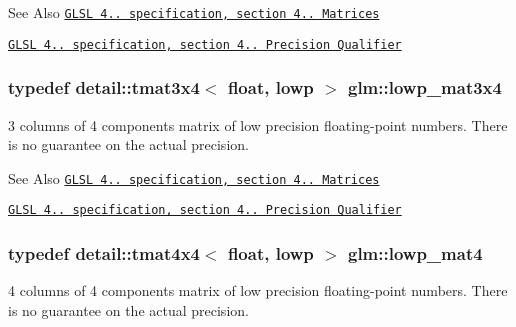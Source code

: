 \begin{DoxySeeAlso}{See Also}
\href{http://www.opengl.org/registry/doc/GLSLangSpec.4.20.8.pdf}{\tt G\-L\-S\-L 4.. specification, section 4.. Matrices} 

\href{http://www.opengl.org/registry/doc/GLSLangSpec.4.20.8.pdf}{\tt G\-L\-S\-L 4.. specification, section 4.. Precision Qualifier} 
\end{DoxySeeAlso}
\hypertarget{group__core__precision_ga9cea06e7378fe59abf95c1f56edc4320}{
\subsubsection[{lowp\-\_\-mat3x4}]{\setlength{\rightskip}{0pt plus 5cm}typedef detail\-::tmat3x4$<$ float, lowp $>$ {\bf glm\-::lowp\-\_\-mat3x4}}}\label{group__core__precision_ga9cea06e7378fe59abf95c1f56edc4320}
3 columns of 4 components matrix of low precision floating-\/point numbers. There is no guarantee on the actual precision.

\begin{DoxySeeAlso}{See Also}
\href{http://www.opengl.org/registry/doc/GLSLangSpec.4.20.8.pdf}{\tt G\-L\-S\-L 4.. specification, section 4.. Matrices} 

\href{http://www.opengl.org/registry/doc/GLSLangSpec.4.20.8.pdf}{\tt G\-L\-S\-L 4.. specification, section 4.. Precision Qualifier} 
\end{DoxySeeAlso}
\hypertarget{group__core__precision_ga8f6fef75ce51e9d6db7971478ad1f1c2}{
\subsubsection[{lowp\-\_\-mat4}]{\setlength{\rightskip}{0pt plus 5cm}typedef detail\-::tmat4x4$<$ float, lowp $>$ {\bf glm\-::lowp\-\_\-mat4}}}\label{group__core__precision_ga8f6fef75ce51e9d6db7971478ad1f1c2}
4 columns of 4 components matrix of low precision floating-\/point numbers. There is no guarantee on the actual precision.

